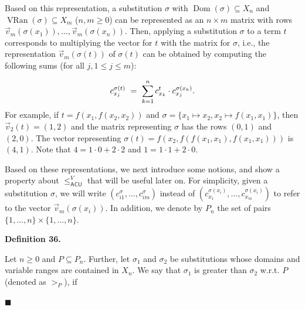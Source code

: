 \documentclass[10pt,a4paper]{amsart}
\begin{document}
 
Based on this representation, a substitution $\sigma$ with $\operatorname{Dom}(\sigma)\subseteq X_{n}$ and $\operatorname{VRan}(\sigma)\subseteq X_{m}$ ($n,m\geq 0$) can be represented as an $n\times m$ matrix with rows $\vec{v}_{m}(\sigma(x_{1})),\ldots,\vec{v}_{m}(\sigma(x_{n}))$. Then, applying a substitution $\sigma$ to a term $t$ corresponds to multiplying the vector for $t$ with the matrix for $\sigma$, i.e., the representation $\vec{v}_{m}(\sigma(t))$ of $\sigma(t)$ can be obtained by computing the following sums (for all $j,1\leq j\leq m$):\par
    \[c^{\sigma(t)}_{x_{j}}\ =\ \sum\limits_{k=1}^{n}c^{t}_{x_{k}}\cdot c^{\sigma(x_%
{k})}_{x_{j}}.\]    
For example, if $t=f(x_{1},f(x_{2},x_{2}))$ and $\sigma=\{x_{1}\mapsto x_{2},x_{2}\mapsto f(x_{1},x_{1})\}$, then $\vec{v}_{2}(t)=(1,2)$ and the matrix representing $\sigma$ has the rows $(0,1)$ and $(2,0)$. The vector representing $\sigma(t)=f(x_{2},f(f(x_{1},x_{1}),f(x_{1},x_{1})))$ is $(4,1)$. Note that $4=1\cdot 0+2\cdot 2$ and $1=1\cdot 1+2\cdot 0$.\par
 
 
 
Based on these representations, we next introduce some notions, and show a property about $\leq_{\mathsf{ACU}}^{V}$ that will be useful later on. For simplicity, given a substitution $\sigma$, we will write $(c^{\sigma}_{i1},\ldots,c^{\sigma}_{im})$ instead of $(c^{\sigma(x_{i})}_{x_{1}},\ldots,c^{\sigma(x_{i})}_{x_{m}})$ to refer to the vector $\vec{v}_{m}(\sigma(x_{i}))$. In addition, we denote by $P_{n}$ the set of pairs $\{1,\ldots,n\}\times\{1,\ldots,n\}$.\par
 
 
 
\par\medskip\noindent\textbf{Definition 36.}\par
 
 
Let $n\geq 0$ and $P\subseteq P_{n}$. Further, let $\sigma_{1}$ and $\sigma_{2}$ be substitutions whose domains and variable ranges are contained in $X_{n}$. We say that $\sigma_{1}$ is greater than $\sigma_{2}$ w.r.t. $P$ (denoted as $>_{P}$), if\par
  
\par\noindent  $\blacksquare$ 
 
\end{document}
